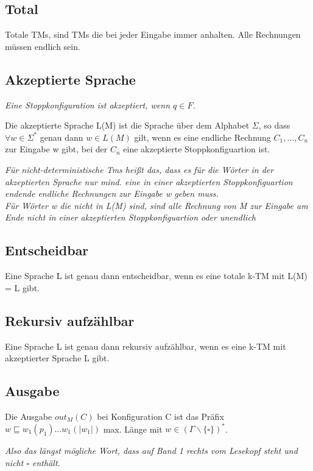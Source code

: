\documentclass[DIV=15]{scrartcl}
\begin{document}
    \subsection{Total}
        Totale TMs, sind TMs die bei jeder Eingabe immer anhalten. Alle Rechnungen müssen endlich sein.
    \subsection{Akzeptierte Sprache}
        \textit{Eine Stoppkonfiguration ist akzeptiert, wenn \(q\in F\).}\par\bigskip
        Die akzeptierte Sprache L(M) ist die Sprache über dem Alphabet \(\Sigma\), so dass \(\forall w\in\Sigma^*\) genau dann 
        \(w\in L(M)\) gilt, wenn es eine endliche Rechnung \(C_1,\dots,C_n\) zur Eingabe w gibt, bei der \(C_n\) eine 
        akzeptierte Stoppkonfiguartion ist.\par\bigskip
        \textit{Für nicht-deterministische Tms heißt das, dass es für die Wörter in der akzeptierten Sprache nur mind. eine in einer 
        akzeptierten Stoppkonfiguartion endende endliche Rechnungen zur Eingabe w geben muss.\\
        Für Wörter w die nicht in L(M) sind, sind alle Rechnung von M zur Eingabe am Ende nicht in einer akzeptierten Stoppkonfiguartion oder unendlich}
    \subsection{Entscheidbar}
        Eine Sprache L ist genau dann entscheidbar, wenn es eine totale k-TM mit L(M) = L gibt.
    \subsection{Rekursiv aufzählbar}
        Eine Sprache L ist genau dann rekursiv aufzählbar, wenn es eine k-TM mit akzeptierter Sprache L gibt.
    \subsection{Ausgabe} 
        Die Ausgabe \(out_M(C)\) bei Konfiguration C ist das Präfix \(w\sqsubseteq w_1(p_1)\dots w_1(|w_1|)\) max. Länge mit 
        \(w\in (\Gamma\backslash\{\square\})^*\).\par\bigskip
        \textit{Also das längst mögliche Wort, dass auf Band 1 rechts vom Lesekopf steht und nicht \(\square\) enthält.}
\end{document}
